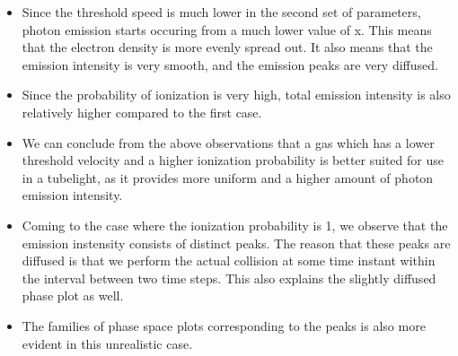 \documentclass{article}
\begin{document}
\begin{itemize}
\item
  Since the threshold speed is much lower in the second set of
  parameters, photon emission starts occuring from a much lower value of
  x. This means that the electron density is more evenly spread out. It
  also means that the emission intensity is very smooth, and the
  emission peaks are very diffused.
\item
  Since the probability of ionization is very high, total emission
  intensity is also relatively higher compared to the first case.
\item
  We can conclude from the above observations that a gas which has a
  lower threshold velocity and a higher ionization probability is better
  suited for use in a tubelight, as it provides more uniform and a
  higher amount of photon emission intensity.
\item
  Coming to the case where the ionization probability is 1, we observe
  that the emission instensity consists of distinct peaks. The reason
  that these peaks are diffused is that we perform the actual collision
  at some time instant within the interval between two time steps. This
  also explains the slightly diffused phase plot as well.
\item
  The families of phase space plots corresponding to the peaks is also
  more evident in this unrealistic case.
\end{itemize}
    
    
    
\end{document}
